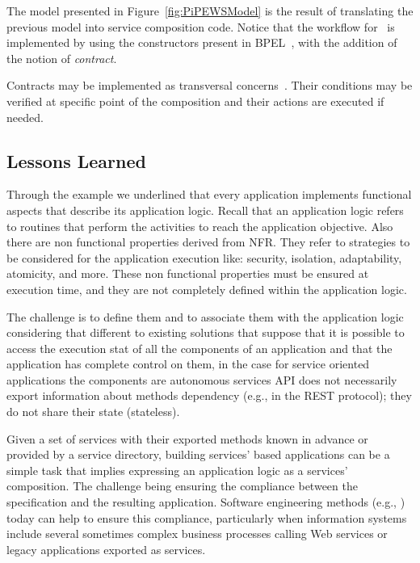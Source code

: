 The model presented in Figure~\ref{fig:PiPEWSModel} is the result of translating the previous model into service composition code.
Notice that the workflow for \FlyingPig\ is implemented by using the constructors present in BPEL~\cite{BPEL}, with the addition of the notion of \textit{contract}.

Contracts may be implemented as transversal concerns~\cite{aspects}.
Their conditions may be verified at specific point of the composition and their actions are executed if needed.

\subsection{Lessons Learned}

Through the example we underlined that every application implements functional aspects that describe its application logic.
Recall that an application logic refers to routines that perform the activities to reach the application objective.
Also there are non functional properties derived from NFR. They refer to strategies to be considered for the application execution like: security, isolation, adaptability, atomicity, and more.
These non functional properties must be ensured at execution time, and they are not completely defined within the application logic.

The challenge is to define them and to associate them with the application logic considering that different to existing solutions that suppose that it is possible to access the execution stat of all the components  of an application and that the application has complete control on them, in the case for service oriented applications  the components are autonomous services
API does not necessarily export information about methods dependency (e.g., in the REST protocol);
they do not share their state (stateless).

Given a set of services with their exported methods known in advance or provided by a  service directory, building services' based applications can be  a simple task that implies expressing an application logic as a services' composition. The challenge being  ensuring the compliance between the specification and the resulting application. Software engineering methods (e.g., \cite{1,2,decastro1,PapazoglouH06}) today can help to ensure this compliance, particularly when information systems include several sometimes complex business processes calling Web services or legacy applications exported as services.

